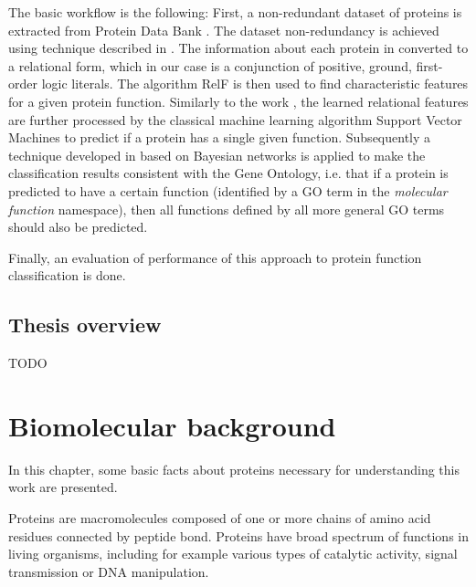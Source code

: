 \documentclass[11pt,twoside,a4paper]{book}
\begin{document}
The basic workflow is the following:
First, a non-redundant dataset of proteins is extracted from Protein Data Bank \cite{pdb}.
The dataset non-redundancy is achieved using technique described in \cite{maxind}.
The information about each protein in converted to a relational form, 
which in our case is a conjunction of positive, ground, first-order logic literals.
The algorithm RelF \cite{relf} is then used to find characteristic features
for a given protein function.
Similarly to the work \cite{szabova}, the learned relational features are further
processed by the classical machine learning algorithm Support Vector Machines
to predict if a protein has a single given function.
Subsequently a technique developed in \cite{bnet} based on Bayesian networks is applied to make the classification
results consistent with the Gene Ontology,
i.e. that if a protein is predicted to have a certain function
(identified by a GO term in the \emph{molecular function} namespace),
then all functions defined by all more general GO terms should also be predicted.

Finally, an evaluation of performance of this approach to protein function classification is done. 


\section{Thesis overview}
TODO



\chapter{Biomolecular background}
In this chapter, some basic facts about proteins
necessary for understanding this work are presented.

Proteins are macromolecules composed of one or more chains of amino acid residues
connected by peptide bond.
Proteins have broad spectrum of functions in living organisms, including for example 
various types of catalytic activity, signal transmission or DNA manipulation.
\end{document}
